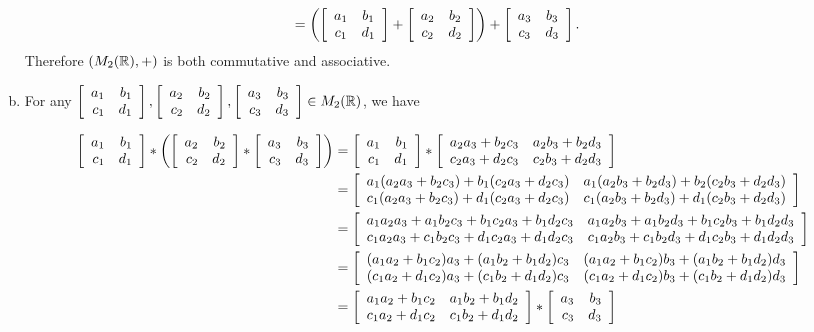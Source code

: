 \documentclass[11pt,fleqn,dvipsnames,usenames]{article}
\begin{document}
\begin{enumerate}[(a)]
\begin{align*}
&= \left(\MATRIX{cc}{a_{1} & b_{1}\\c_{1} & d_{1}} + \MATRIX{cc}{a_{2} & b_{2}\\c_{2} & d_{2}}\right) + \MATRIX{cc}{a_{3} & b_{3}\\c_{3} & d_{3}}.
\end{align*}
Therefore $(M_{2}(\R), +)$ is both commutative and associative.
\item For any $\MATRIX{rr}{a_{1} & b_{1}\\c_{1} & d_{1}}, \MATRIX{rr}{a_{2} & b_{2}\\c_{2} & d_{2}}, \MATRIX{rr}{a_{3} & b_{3}\\c_{3} & d_{3}}\in M_{2}(\R)$, we have
\begin{adjustwidth}{-75pt}{0pt}
\begin{align*}
\MATRIX{rr}{a_{1} & b_{1}\\c_{1} & d_{1}}* \left(\MATRIX{rr}{a_{2} & b_{2}\\c_{2} & d_{2}}* \MATRIX{rr}{a_{3} & b_{3}\\c_{3} & d_{3}}\right) 
&= \MATRIX{rr}{a_{1} & b_{1}\\c_{1} & d_{1}}* \MATRIX{rr}{a_{2}a_{3} + b_{2}c_{3} & a_{2}b_{3} + b_{2}d_{3}\\c_{2}a_{3} + d_{2}c_{3} & c_{2}b_{3} + d_{2}d_{3}}\\
&= \MATRIX{rr}{a_{1}(a_{2}a_{3} + b_{2}c_{3}) + b_{1}(c_{2}a_{3} + d_{2}c_{3}) & a_{1}(a_{2}b_{3} + b_{2}d_{3}) + b_{2}(c_{2}b_{3} + d_{2}d_{3})\\
c_{1}(a_{2}a_{3} + b_{2}c_{3}) + d_{1}(c_{2}a_{3} + d_{2}c_{3}) & c_{1}(a_{2}b_{3} + b_{2}d_{3}) + d_{1}(c_{2}b_{3} + d_{2}d_{3})}\\
&= \MATRIX{rr}{a_{1}a_{2}a_{3} + a_{1}b_{2}c_{3} + b_{1}c_{2}a_{3} + b_{1}d_{2}c_{3} & a_{1}a_{2}b_{3} + a_{1}b_{2}d_{3} + b_{1}c_{2}b_{3} + b_{1}d_{2}d_{3}\\
c_{1}a_{2}a_{3} + c_{1}b_{2}c_{3} + d_{1}c_{2}a_{3} + d_{1}d_{2}c_{3} & c_{1}a_{2}b_{3} + c_{1}b_{2}d_{3} + d_{1}c_{2}b_{3} + d_{1}d_{2}d_{3}}\\
&= \MATRIX{rr}{(a_{1}a_{2} + b_{1}c_{2})a_{3} + (a_{1}b_{2} + b_{1}d_{2})c_{3} & (a_{1}a_{2} + b_{1}c_{2})b_{3} + (a_{1}b_{2} + b_{1}d_{2})d_{3}\\
(c_{1}a_{2} + d_{1}c_{2})a_{3} + (c_{1}b_{2} + d_{1}d_{2})c_{3} & (c_{1}a_{2} + d_{1}c_{2})b_{3} + (c_{1}b_{2} + d_{1}d_{2})d_{3}}\\
&= \MATRIX{rr}{ a_{1}a_{2} + b_{1}c_{2} & a_{1}b_{2} + b_{1}d_{2}\\ c_{1}a_{2} + d_{1}c_{2} & c_{1}b_{2} + d_{1}d_{2}}* \MATRIX{rr}{a_{3} & b_{3}\\c_{3} & d_{3}}\\

\end{align*}
\end{adjustwidth}
\end{enumerate}
\end{document}

